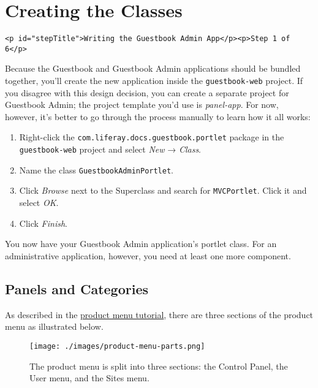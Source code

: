\chapter{Creating the Classes}\label{creating-the-classes}

\begin{verbatim}
<p id="stepTitle">Writing the Guestbook Admin App</p><p>Step 1 of 6</p>
\end{verbatim}

Because the Guestbook and Guestbook Admin applications should be bundled
together, you'll create the new application inside the
\texttt{guestbook-web} project. If you disagree with this design
decision, you can create a separate project for Guestbook Admin; the
project template you'd use is \emph{panel-app}. For now, however, it's
better to go through the process manually to learn how it all works:

\begin{enumerate}
\def\labelenumi{\arabic{enumi}.}
\item
  Right-click the \texttt{com.liferay.docs.guestbook.portlet} package in
  the \texttt{guestbook-web} project and select \emph{New} →
  \emph{Class}.
\item
  Name the class \texttt{GuestbookAdminPortlet}.
\item
  Click \emph{Browse} next to the Superclass and search for
  \texttt{MVCPortlet}. Click it and select \emph{OK}.
\item
  Click \emph{Finish}.
\end{enumerate}

You now have your Guestbook Admin application's portlet class. For an
administrative application, however, you need at least one more
component.

\section{Panels and Categories}\label{panels-and-categories}

As described in the
\href{/docs/7-2/customization/-/knowledge_base/c/customizing-the-product-menu}{product
menu tutorial}, there are three sections of the product menu as
illustrated below.

\begin{figure}
\centering
\texttt{[image: ./images/product-menu-parts.png]}
\caption{The product menu is split into three sections: the Control
Panel, the User menu, and the Sites menu.}
\end{figure}

